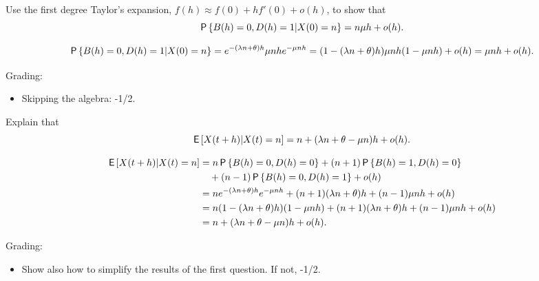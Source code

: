 \begin{exercise}[1]
Use the first degree Taylor's expansion, $f(h) \approx f(0) + hf'(0) + o(h)$, to show  that
\begin{equation}
\P{B(h)=0, D(h)=1|X(0) = n} = n \mu h + o(h).
\end{equation}
\begin{solution}
\begin{equation}
\P{B(h)=0, D(h)=1|X(0) = n } = e^{-(\lambda n + \theta)h} \mu n h e^{-\mu n h} = (1 - (\lambda n + \theta) h) \mu n h (1-\mu n h) + o(h) = \mu n h + o(h).
\end{equation}

Grading:
\begin{itemize}
\item Skipping the algebra: -1/2.
\end{itemize}
\end{solution}
\end{exercise}

\begin{exercise}[2]
Explain that
\begin{equation}
\E{X(t+h) | X(t) =n }   = n  + (\lambda n + \theta - \mu n )h + o(h).
\end{equation}
\begin{solution}
\begin{align}
\E{X(t+h) | X(t)=n }
  &= n \P{B(h)=0, D(h) = 0} + (n+1)\P{B(h)=1, D(h) = 0} \\
  &\quad + (n-1)\P{B(h)=0, D(h) = 1}  + o(h) \\
 &= n e^{-(\lambda n + \theta) h} e^{-\mu n h} + (n+1) (\lambda n + \theta) h + (n -1)\mu n h + o(h) \\
 &= n (1-(\lambda n + \theta) h) (1-\mu n h)  + (n +1) (\lambda n + \theta) h + (n -1)\mu n h + o(h) \\
 &= n + (\lambda n + \theta - \mu n) h + o(h).
\end{align}

Grading:
\begin{itemize}
\item Show also how to simplify the results of the first question. If not, -1/2.
\end{itemize}
\end{solution}
\end{exercise}

